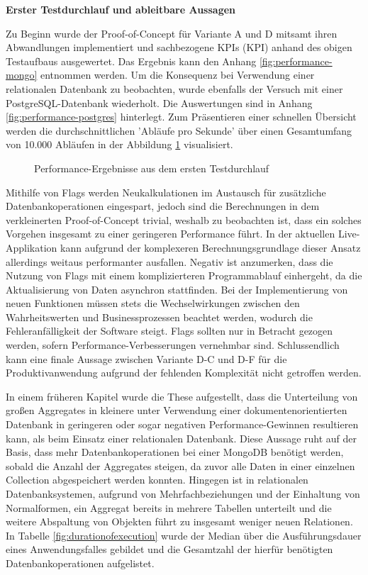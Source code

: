 \textbf{Erster Testdurchlauf und ableitbare Aussagen}

Zu Beginn wurde der Proof-of-Concept für Variante A und D mitsamt ihren Abwandlungen implementiert und sachbezogene \acrshort{KPI}s (\acrlong{KPI}) anhand des obigen Testaufbaus ausgewertet. Das Ergebnis kann den Anhang \ref{fig:performance-mongo} entnommen werden. Um die Konsequenz bei Verwendung einer relationalen Datenbank zu beobachten, wurde ebenfalls der Versuch mit einer PostgreSQL-Datenbank wiederholt. Die Auswertungen sind in Anhang \ref{fig:performance-postgres} hinterlegt. Zum Präsentieren einer schnellen Übersicht werden die durchschnittlichen 'Abläufe pro Sekunde' über einen Gesamtumfang von 10.000 Abläufen in der Abbildung \ref{fig:PerformanceDefault} visualisiert.

\begin{figure}[htpb]
	\centering
	\footnotesize
	
	\caption{Performance-Ergebnisse aus dem ersten Testdurchlauf}
	\label{fig:PerformanceDefault}
\end{figure}

Mithilfe von Flags werden Neukalkulationen im Austausch für zusätzliche Datenbankoperationen eingespart, jedoch sind die Berechnungen in dem verkleinerten Proof-of-Concept trivial, weshalb zu beobachten ist, dass ein solches Vorgehen insgesamt zu einer geringeren Performance führt. In der aktuellen Live-Applikation kann aufgrund der komplexeren Berechnungsgrundlage dieser Ansatz allerdings weitaus performanter ausfallen. Negativ ist anzumerken, dass die Nutzung von Flags mit einem komplizierteren Programmablauf einhergeht, da die Aktualisierung von Daten asynchron stattfinden. Bei der Implementierung von neuen Funktionen müssen stets die Wechselwirkungen zwischen den Wahrheitswerten und Businessprozessen beachtet werden, wodurch die Fehleranfälligkeit der Software steigt. Flags sollten nur in Betracht gezogen werden, sofern Performance-Verbesserungen vernehmbar sind. Schlussendlich kann eine finale Aussage zwischen Variante D-C und D-F für die Produktivanwendung aufgrund der fehlenden Komplexität nicht getroffen werden.

In einem früheren Kapitel wurde die These aufgestellt, dass die Unterteilung von großen Aggregates in kleinere unter Verwendung einer dokumentenorientierten Datenbank in geringeren oder sogar negativen Performance-Gewinnen resultieren kann, als beim Einsatz einer relationalen Datenbank. Diese Aussage ruht auf der Basis, dass mehr Datenbankoperationen bei einer MongoDB benötigt werden, sobald die Anzahl der Aggregates steigen, da zuvor alle Daten in einer einzelnen Collection abgespeichert werden konnten. Hingegen ist in relationalen Datenbanksystemen, aufgrund von Mehrfachbeziehungen und der Einhaltung von Normalformen, ein Aggregat bereits in mehrere Tabellen unterteilt und die weitere Abspaltung von Objekten führt zu insgesamt weniger neuen Relationen. In Tabelle \ref{fig:durationofexecution} wurde der Median über die Ausführungsdauer eines Anwendungsfalles gebildet und die Gesamtzahl der hierfür benötigten Datenbankoperationen aufgelistet. 

